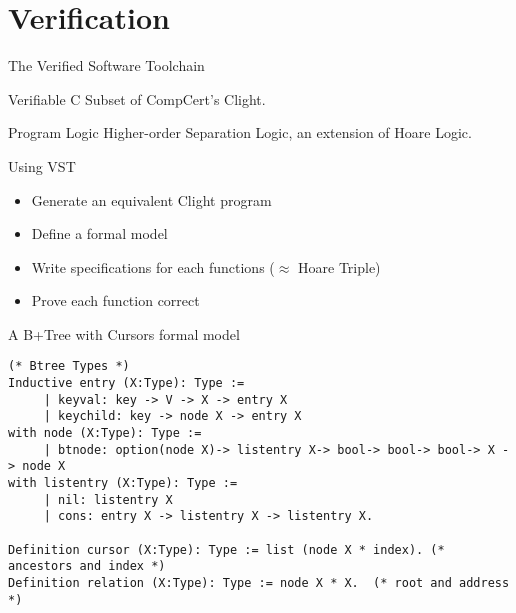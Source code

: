 \documentclass[page number,usenames,dvipsnames]{beamer}
\begin{document}
\section{Verification}
\begin{frame}{The Verified Software Toolchain}

  \begin{block}{Verifiable C}
    Subset of CompCert's Clight.
  \end{block}
  \vfill
  \begin{block}{Program Logic}
    Higher-order Separation Logic, an extension of Hoare Logic.
  \end{block}
  \vfill
  \begin{block}{Using VST}
    \begin{itemize}
    \item Generate an equivalent Clight program
    \item Define a formal model
    \item Write specifications for each functions ($\approx$ Hoare Triple)
    \item Prove each function correct
    \end{itemize}
  \end{block}
  
\end{frame}

\begin{frame}[fragile]{A B+Tree with Cursors formal model}

  \begin{lstlisting}[language=Coq,basicstyle=\scriptsize]
(* Btree Types *)
Inductive entry (X:Type): Type :=
     | keyval: key -> V -> X -> entry X
     | keychild: key -> node X -> entry X
with node (X:Type): Type :=
     | btnode: option(node X)-> listentry X-> bool-> bool-> bool-> X -> node X
with listentry (X:Type): Type :=
     | nil: listentry X
     | cons: entry X -> listentry X -> listentry X.

Definition cursor (X:Type): Type := list (node X * index). (* ancestors and index *)
Definition relation (X:Type): Type := node X * X.  (* root and address *)
  \end{lstlisting}
  \vspace{-1em}
  \vfill
  \cursor
  
\end{frame}
\end{document}
